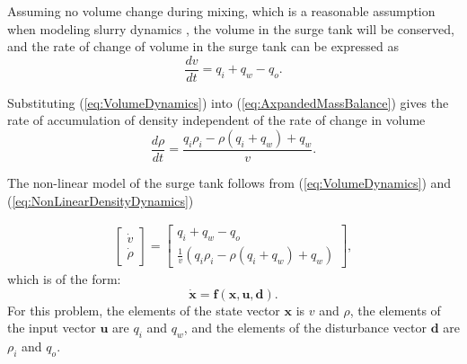 \documentclass[preprint,authoryear,12pt]{elsarticle}
\begin{document}

Assuming no volume change during mixing, which is a reasonable assumption when modeling slurry dynamics \citep{Dontsov2014}, the volume in the surge tank will be conserved, and the rate of change of volume in the surge tank can be expressed as
\begin{equation}
\frac{dv}{dt} = q_i + q_w - q_o.
\label{eq:VolumeDynamics}
\end{equation}

Substituting (\ref{eq:VolumeDynamics}) into (\ref{eq:AxpandedMassBalance}) gives the rate of accumulation of density independent of the rate of change in volume 
\begin{equation}
\frac{d\rho}{dt} = \frac{q_i\rho_i - \rho(q_i + q_w) + q_w}{v}.				 
\label{eq:NonLinearDensityDynamics}
\end{equation}

The non-linear model of the surge tank follows from (\ref{eq:VolumeDynamics}) and (\ref{eq:NonLinearDensityDynamics})

\begin{gather}
	\begin{bmatrix} \dot{v}\\ \dot{\rho} \end{bmatrix}
	=
	\begin{bmatrix} q_i + q_w - q_o \\ \frac{1}{v}(q_i\rho_i - \rho(q_i + q_w) + q_w) \end{bmatrix},
\label{eq:NonLinearStateSpace}
\end{gather}
which is of the form:
\begin{equation}
\boldsymbol{\dot{x}} = \boldsymbol{f}(\boldsymbol{x}, \boldsymbol{u}, \boldsymbol{d}).				 
\label{eq:NonLinearStateSpaceForm}
\end{equation}
For this problem, the elements of the state vector $\boldsymbol{x}$ is $v$ and $\rho$, the elements of the input vector  $\boldsymbol{u}$ are $q_i$ and $q_w$, and the elements of the disturbance vector $\boldsymbol{d}$ are $\rho_i$ and $q_o$.

\end{document}
